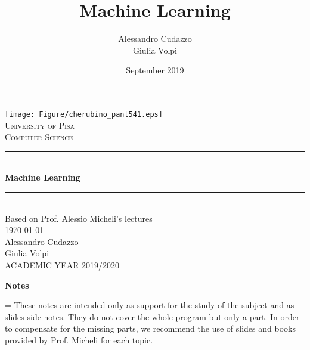 \documentclass{article}
\title{Machine Learning}
\author{Alessandro Cudazzo\\ Giulia Volpi}
\date{September 2019}
\theoremstyle{break}
\theoremstyle{break}
\theoremstyle{break}
\theoremstyle{break}
\theoremstyle{remark}
\begin{document}
\def\thesistitle{Machine Learning}
\def\thesisauthorfirst{Alessandro Cudazzo}
\def\thesisauthorsecond{Giulia Volpi}
\def\thesisdate{\today}
\def\theacademicyeas{ACADEMIC YEAR 2019/2020}


\begin{titlepage}
	\newcommand{\HRule}{\rule{\linewidth}{0.5mm}}
	\center

	\texttt{[image: Figure/cherubino\_pant541.eps]}\\[0.9cm]
	\textsc{\Large University of Pisa}\\[0.3cm]
	\textsc{\Large Computer Science}\\[0.6cm]
	\HRule \\[0.6cm]
	{ \LARGE \bfseries \thesistitle}\\[0.3cm]
	\HRule \\[0.6cm]
	{\large Based on Prof. Alessio Micheli's lectures}\\[0.6cm]
	{\large \thesisdate}\\[2.7cm]
    {\Large \thesisauthorfirst \\ \vspace{0.6cm} \thesisauthorsecond}\\[4cm]
    \vspace*{\fill}
	{\large \theacademicyeas}\\
	\clearpage
\end{titlepage}
\clearpage
\clearpage\thispagestyle{empty}\clearpage\setcounter{page}{1}


\cleardoublepage
\centerline{\large\bfseries Notes}
\nobreak
\vspace{1pc}
\begingroup\small
{}\textwidth
\rightskip=\leftskip
\noindent These notes are intended only as support for the study of the subject and as slides side notes. They do not cover the whole program but only a part. 
In order to compensate for the missing parts, we recommend the use of slides and books provided by Prof. Micheli for each topic. 
\end{document}
